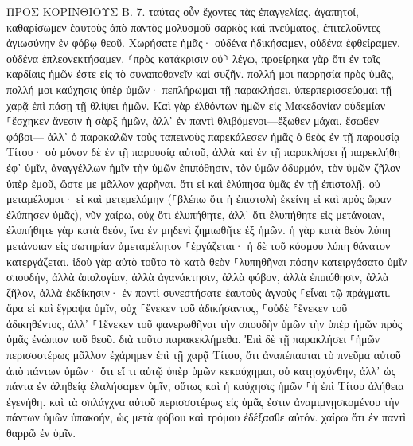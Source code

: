 \documentclass[twoside, 9pt]{extreport}
\begin{document}
ΠΡΟΣ ΚΟΡΙΝΘΙΟΥΣ Β.
7.
ταύτας οὖν ἔχοντες τὰς ἐπαγγελίας, ἀγαπητοί, καθαρίσωμεν ἑαυτοὺς ἀπὸ παντὸς μολυσμοῦ σαρκὸς καὶ πνεύματος, ἐπιτελοῦντες ἁγιωσύνην ἐν φόβῳ θεοῦ. 
Χωρήσατε ἡμᾶς· οὐδένα ἠδικήσαμεν, οὐδένα ἐφθείραμεν, οὐδένα ἐπλεονεκτήσαμεν. 
⸂πρὸς κατάκρισιν οὐ⸃ λέγω, προείρηκα γὰρ ὅτι ἐν ταῖς καρδίαις ἡμῶν ἐστε εἰς τὸ συναποθανεῖν καὶ συζῆν. 
πολλή μοι παρρησία πρὸς ὑμᾶς, πολλή μοι καύχησις ὑπὲρ ὑμῶν· πεπλήρωμαι τῇ παρακλήσει, ὑπερπερισσεύομαι τῇ χαρᾷ ἐπὶ πάσῃ τῇ θλίψει ἡμῶν. 
Καὶ γὰρ ἐλθόντων ἡμῶν εἰς Μακεδονίαν οὐδεμίαν ⸀ἔσχηκεν ἄνεσιν ἡ σὰρξ ἡμῶν, ἀλλ᾽ ἐν παντὶ θλιβόμενοι—ἔξωθεν μάχαι, ἔσωθεν φόβοι— 
ἀλλ᾽ ὁ παρακαλῶν τοὺς ταπεινοὺς παρεκάλεσεν ἡμᾶς ὁ θεὸς ἐν τῇ παρουσίᾳ Τίτου· 
οὐ μόνον δὲ ἐν τῇ παρουσίᾳ αὐτοῦ, ἀλλὰ καὶ ἐν τῇ παρακλήσει ᾗ παρεκλήθη ἐφ᾽ ὑμῖν, ἀναγγέλλων ἡμῖν τὴν ὑμῶν ἐπιπόθησιν, τὸν ὑμῶν ὀδυρμόν, τὸν ὑμῶν ζῆλον ὑπὲρ ἐμοῦ, ὥστε με μᾶλλον χαρῆναι. 
ὅτι εἰ καὶ ἐλύπησα ὑμᾶς ἐν τῇ ἐπιστολῇ, οὐ μεταμέλομαι· εἰ καὶ μετεμελόμην (⸀βλέπω ὅτι ἡ ἐπιστολὴ ἐκείνη εἰ καὶ πρὸς ὥραν ἐλύπησεν ὑμᾶς), 
νῦν χαίρω, οὐχ ὅτι ἐλυπήθητε, ἀλλ᾽ ὅτι ἐλυπήθητε εἰς μετάνοιαν, ἐλυπήθητε γὰρ κατὰ θεόν, ἵνα ἐν μηδενὶ ζημιωθῆτε ἐξ ἡμῶν. 
ἡ γὰρ κατὰ θεὸν λύπη μετάνοιαν εἰς σωτηρίαν ἀμεταμέλητον ⸀ἐργάζεται· ἡ δὲ τοῦ κόσμου λύπη θάνατον κατεργάζεται. 
ἰδοὺ γὰρ αὐτὸ τοῦτο τὸ κατὰ θεὸν ⸀λυπηθῆναι πόσην κατειργάσατο ὑμῖν σπουδήν, ἀλλὰ ἀπολογίαν, ἀλλὰ ἀγανάκτησιν, ἀλλὰ φόβον, ἀλλὰ ἐπιπόθησιν, ἀλλὰ ζῆλον, ἀλλὰ ἐκδίκησιν· ἐν παντὶ συνεστήσατε ἑαυτοὺς ἁγνοὺς ⸀εἶναι τῷ πράγματι. 
ἄρα εἰ καὶ ἔγραψα ὑμῖν, οὐχ ⸀ἕνεκεν τοῦ ἀδικήσαντος, ⸀οὐδὲ ⸁ἕνεκεν τοῦ ἀδικηθέντος, ἀλλ᾽ ⸀1ἕνεκεν τοῦ φανερωθῆναι τὴν σπουδὴν ὑμῶν τὴν ὑπὲρ ἡμῶν πρὸς ὑμᾶς ἐνώπιον τοῦ θεοῦ. 
διὰ τοῦτο παρακεκλήμεθα. Ἐπὶ δὲ τῇ παρακλήσει ⸀ἡμῶν περισσοτέρως μᾶλλον ἐχάρημεν ἐπὶ τῇ χαρᾷ Τίτου, ὅτι ἀναπέπαυται τὸ πνεῦμα αὐτοῦ ἀπὸ πάντων ὑμῶν· 
ὅτι εἴ τι αὐτῷ ὑπὲρ ὑμῶν κεκαύχημαι, οὐ κατῃσχύνθην, ἀλλ᾽ ὡς πάντα ἐν ἀληθείᾳ ἐλαλήσαμεν ὑμῖν, οὕτως καὶ ἡ καύχησις ἡμῶν ⸀ἡ ἐπὶ Τίτου ἀλήθεια ἐγενήθη. 
καὶ τὰ σπλάγχνα αὐτοῦ περισσοτέρως εἰς ὑμᾶς ἐστιν ἀναμιμνῃσκομένου τὴν πάντων ὑμῶν ὑπακοήν, ὡς μετὰ φόβου καὶ τρόμου ἐδέξασθε αὐτόν. 
χαίρω ὅτι ἐν παντὶ θαρρῶ ἐν ὑμῖν. 
\end{document}
